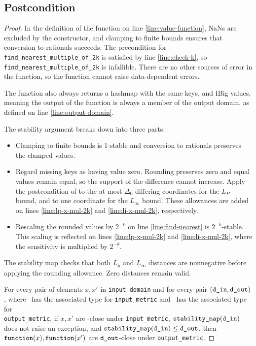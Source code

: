 \documentclass{article}
\begin{document}
\subsection*{Postcondition}
\begin{theorem}
\end{theorem}

\begin{proof}
    In the definition of the function on line \ref{line:value-function},
    NaNs are excluded by the constructor, and clamping to finite bounds ensures that conversion to rationals succeeds.
    The precondition for \texttt{find\_nearest\_multiple\_of\_2k} is satisfied by line \ref{line:check-k},
    so \texttt{find\_nearest\_multiple\_of\_2k} is infallible.
    There are no other sources of error in the function,
    so the function cannot raise data-dependent errors.

    The function also always returns a hashmap with the same keys, and IBig values,
    meaning the output of the function is always a member of the output domain,
    as defined on line \ref{line:output-domain}.

    The stability argument breaks down into three parts:
    \begin{itemize}
        \item Clamping to finite bounds is 1-stable and conversion to rationals preserves the clamped values.
        \item Regard missing keys as having value zero. Rounding preserves zero and equal values remain equal,
        so the support of the difference cannot increase. Apply the postcondition of
        to the at most $\Delta_0$ differing coordinates for the $L_P$ bound,
        and to one coordinate for the $L_\infty$ bound.
        These allowances are added on lines \ref{line:lp-x-mul-2k} and \ref{line:li-x-mul-2k}, respectively.

        \item Rescaling the rounded values by $2^{-k}$ on line \ref{line:find-nearest} is $2^{-k}$-stable.
            This scaling is reflected on lines \ref{line:lp-x-mul-2k} and \ref{line:li-x-mul-2k},
            where the sensitivity is multiplied by $2^{-k}$.
    \end{itemize}

    The stability map checks that both $L_p$ and $L_\infty$ distances are nonnegative
    before applying the rounding allowance. Zero distances remain valid.

    For every pair of elements $x, x'$ in \texttt{input\_domain} and for every pair $(\texttt{d\_in}, \texttt{d\_out})$,
    where \din\ has the associated type for \texttt{input\_metric} and \dout\ has the associated type for \\ \texttt{output\_metric},
    if $x, x'$ are \din-close under \texttt{input\_metric}, $\texttt{stability\_map}(\texttt{d\_in})$ does not raise an exception,
    and $\texttt{stability\_map}(\texttt{d\_in}) \leq \texttt{d\_out}$,
    then $\texttt{function}(x), \texttt{function}(x')$ are $\texttt{d\_out}$-close under \texttt{output\_metric}.
\end{proof}
\end{document}
